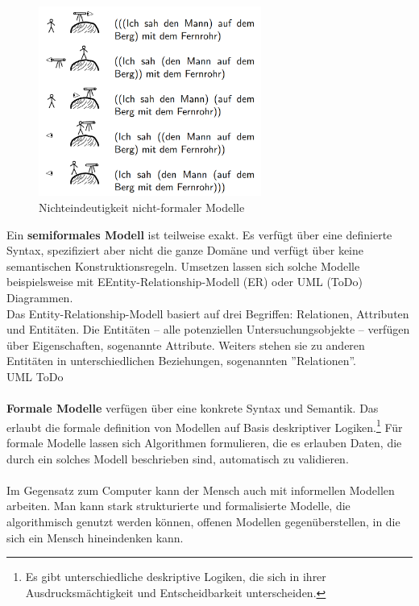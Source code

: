 \documentclass[12pt,a4paper]{article}
\begin{document}
\begin{figure}[H]
\centering
	\includegraphics[width=0.65\textwidth]{img/fernrohr.png}  
    \caption[Nichteindeutigkeit nicht-formaler Modelle, KÖNIG Bettina: Vorlesung ''Modellierungsmethoden der Informatik'', \protect\url{http://www.ti.inf.uni-due.de/fileadmin/public/teaching/mod/slides/ws201112/einfuehrung.pdf}, 10.06.2019]{Nichteindeutigkeit nicht-formaler Modelle}\label{fig:fernrohr}
\end{figure} 
Ein \textbf{semiformales Modell} ist teilweise exakt. Es verfügt über eine definierte Syntax, spezifiziert aber nicht die ganze Domäne und verfügt über keine semantischen Konstruktionsregeln. Umsetzen lassen sich solche Modelle beispielsweise mit EEntity-Relationship-Modell (ER) oder UML (ToDo) Diagrammen.
\\
Das Entity-Relationship-Modell basiert auf drei Begriffen: Relationen, Attributen und Entitäten. Die Entitäten -- alle potenziellen Untersuchungsobjekte -- verfügen über Eigenschaften, sogenannte Attribute. Weiters stehen sie zu anderen Entitäten in unterschiedlichen Beziehungen, sogenannten ''Relationen''. 
\\
UML ToDo
\\
\\
\textbf{Formale Modelle} verfügen über eine konkrete Syntax und Semantik. Das erlaubt die formale definition von Modellen auf Basis deskriptiver Logiken.\footnote{Es gibt unterschiedliche deskriptive Logiken, die sich in ihrer Ausdrucksmächtigkeit und Entscheidbarkeit unterscheiden.} Für formale Modelle lassen sich Algorithmen formulieren, die es erlauben Daten, die durch ein solches Modell beschrieben sind, automatisch zu validieren.
\\
\\
Im Gegensatz zum Computer kann der Mensch auch mit informellen Modellen arbeiten. Man kann stark strukturierte und formalisierte Modelle, die algorithmisch genutzt werden können, offenen Modellen gegenüberstellen, in die sich ein Mensch hineindenken kann.
\end{document}
